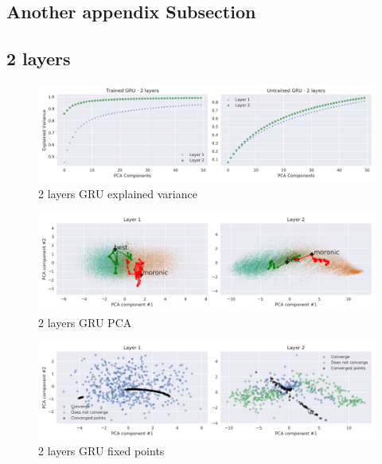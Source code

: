 \documentclass{article}
\begin{document}
\subsection{Another appendix Subsection}

\subsection{2 layers}
\label{anx:2-layers}
\begin{figure}[H]
  \centering
  \includegraphics[width=\textwidth]{../images/gru_2layer_explained_variance.png}
  \caption{2 layers GRU explained variance}
  \label{fig:-images-gru_2layer_explained_variance-png}
\end{figure}
\begin{figure}[H]
  \centering
  \includegraphics[width=\textwidth]{../images/gru_2layer_PCA.png}
  \caption{2 layers GRU PCA}
  \label{fig:-images-gru_2layer_PCA-png}
\end{figure}
\begin{figure}[H]
  \centering
  \includegraphics[width=\textwidth]{../images/gru_2layer_fixed_points.png}
  \caption{2 layers GRU fixed points}
  \label{fig:-images-gru_2layer_fixed_points-png}
\end{figure}
\end{document}
